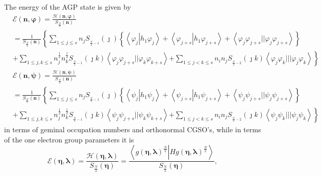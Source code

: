 \documentclass[aps,preprint]{revtex4}%
\begin{document}
The energy of the AGP state is given by \emph{ }
\begin{align*}
&  \mathcal{E}\left(  \mathbf{n,\varphi}\right)  =\frac{\mathcal{H}\left(
\mathbf{n,\varphi}\right)  }{S_{\frac{N}{2}}\left(  \mathbf{n}\right)  }\\
&  =\frac{1}{S_{\frac{N}{2}}\left(  \mathbf{n}\right)  }\left\{  \sum_{1\leq
j\leq s}n_{j}S_{_{\frac{N}{2}-1}}\left(  \jmath\right)  \left\{  \left\langle
\varphi_{j}\left\vert h_{1}\varphi_{j}\right.  \right\rangle +\left\langle
\varphi_{j+s}\left\vert h_{1}\varphi_{j+s}\right.  \right\rangle +\left\langle
\varphi_{j}\varphi_{j+s}||\varphi_{j}\varphi_{j+s}\right\rangle \right\}
\right.  \\
&  +\sum_{1\leq j,k\leq s}n_{j}^{\frac{1}{2}}n_{k}^{\frac{1}{2}}S_{_{\frac
{N}{2}-1}}\left(  \jmath k\right)  \left\langle \varphi_{j}\varphi
_{j+s}||\varphi_{k}\varphi_{k+s}\right\rangle \left.  +\sum_{1\leq j<k\leq
s}n_{i}n_{j}S_{_{\frac{N}{2}-2}}\left(  \jmath k\right)  \left\langle
\varphi_{j}\varphi_{k}|||\varphi_{j}\varphi_{k}\right\rangle \right\}
\end{align*}%
\begin{align*}
&  \mathcal{E}\left(  \mathbf{n,\psi}\right)  =\frac{\mathcal{H}\left(
\mathbf{n,\psi}\right)  }{S_{\frac{N}{2}}\left(  \mathbf{n}\right)  }\\
&  =\frac{1}{S_{\frac{N}{2}}\left(  \mathbf{n}\right)  }\left\{  \sum_{1\leq
j\leq s}n_{j}S_{_{\frac{N}{2}-1}}\left(  \jmath\right)  \left\{  \left\langle
\psi_{j}\left\vert h_{1}\psi_{j}\right.  \right\rangle +\left\langle
\psi_{j+s}\left\vert h_{1}\psi_{j+s}\right.  \right\rangle +\left\langle
\psi_{j}\psi_{j+s}||\psi_{j}\psi_{j+s}\right\rangle \right\}  \right.  \\
&  +\sum_{1\leq j,k\leq s}n_{j}^{\frac{1}{2}}n_{k}^{\frac{1}{2}}S_{_{\frac
{N}{2}-1}}\left(  \jmath k\right)  \left\langle \psi_{j}\psi_{j+s}||\psi
_{k}\psi_{k+s}\right\rangle \left.  +\sum_{1\leq j<k\leq s}n_{i}%
n_{j}S_{_{\frac{N}{2}-2}}\left(  \jmath k\right)  \left\langle \psi_{j}%
\psi_{k}|||\psi_{j}\psi_{k}\right\rangle \right\}
\end{align*}
in terms of geminal occupation numbers and orthonormal CGSO's, while in terms
of the one electron group parameters it is
\begin{equation}
\mathcal{E}\left(  \mathbf{\eta},\mathbf{\lambda}\right)  =\frac
{\mathcal{H}\left(  \mathbf{\eta},\mathbf{\lambda}\right)  }{S_{\frac{N}{2}%
}\left(  \mathbf{\eta}\right)  }=\frac{\left\langle \left.  g\left(
\mathbf{\eta},\mathbf{\lambda}\right)  ^{\frac{N}{2}}\right\vert Hg\left(
\mathbf{\eta},\mathbf{\lambda}\right)  ^{\frac{N}{2}}\right\rangle }%
{S_{\frac{N}{2}}\left(  \mathbf{\eta}\right)  },\label{gp_funct}%
\end{equation}
\end{document}
